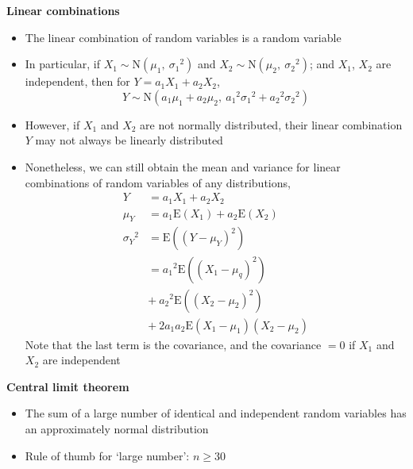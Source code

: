 \documentclass[a4paper]{article}
\newcommand{\heading}[1]{{\small\textbf{#1}}}
\newcommand{\subheading}[1]{{\scriptsize\textbf{#1}}}
\begin{document}
\begin{multicols*}{4}
\heading{Linear combinations}
\begin{itemize} \itemsep -0.5em
    \item The linear combination of random variables is a random
        variable
    \item In particular, if $X_1\sim \mathrm{N}(\mu_1,\ {\sigma_1}^2)$
        and $X_2\sim \mathrm{N}(\mu_2,\ {\sigma_2}^2)$; and $X_1$, 
        $X_2$ are independent, then for $Y = a_1X_1 + a_2X_2$,
        $$Y \sim \mathrm{N}(a_1\mu_1 + a_2\mu_2,\ 
            {a_1}^2{\sigma_1}^2 + {a_2}^2{\sigma_2}^2)$$
    \item However, if $X_1$ and $X_2$ are not normally distributed,
        their linear combination $Y$ may not always be linearly
        distributed
    \item Nonetheless, we can still obtain the mean and variance for
        linear combinations of random variables of any distributions,
        \begin{align*}
            Y &= a_1X_1 + a_2X_2\\
            \mu_Y &= a_1\mathrm{E}(X_1) + a_2\mathrm{E}(X_2) \\
            {\sigma_Y}^2 &= \mathrm{E}((Y-\mu_Y)^2) \\
                &= {a_1}^2\mathrm{E}((X_1-\mu_q)^2) \\
                &+\ {a_2}^2\mathrm{E}((X_2-\mu_2)^2)\\
                &+\  2a_1a_2\mathrm{E}(X_1-\mu_1)(X_2-\mu_2)
        \end{align*}
        Note that the last term is the covariance, and the covariance 
        $=0$ if $X_1$ and $X_2$ are independent
\end{itemize}
\subheading{Central limit theorem}
\begin{itemize} \itemsep -0.5em
    \item The sum of a large number of identical and independent random
        variables has an approximately normal distribution
    \item Rule of thumb for `large number': $n \geq 30$
\end{itemize}



\end{multicols*}
\end{document}
